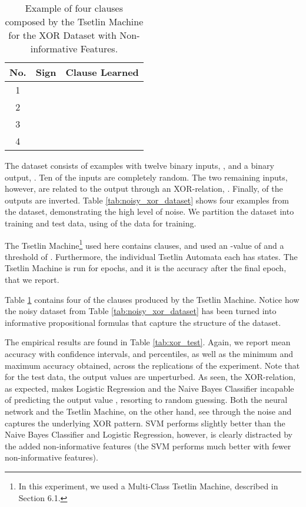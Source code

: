 \documentclass[11pt,a4paper]{article}
\begin{document}
\begin{table}[!bh]
    \centering
    \begin{tabular}{c|c|c}
    {\bf No.}&{\bf Sign}&{\bf Clause Learned}\\
    \hline 
    \hline
    1&&\\
    2&&\\
    3&&\\
    4&&
    \end{tabular}
    \caption{Example of four clauses composed by the Tsetlin Machine for the XOR Dataset with Non-informative Features.}
    \label{tab:noisy_xor_dataset_clauses}
\end{table}

The dataset consists of  examples with twelve binary inputs, , and a binary output, . Ten of the inputs are completely random. The two remaining inputs, however, are related to the output  through an XOR-relation, . Finally,  of the outputs are inverted. Table \ref{tab:noisy_xor_dataset} shows four examples from the dataset, demonstrating the high level of noise. We partition the dataset into training and test data, using  of the data for training.

The Tsetlin Machine\footnote{In this experiment, we used a Multi-Class Tsetlin Machine, described in Section 6.1.} used here contains  clauses, and used an -value of  and a threshold  of . Furthermore, the individual Tsetlin Automata each has  states. The Tsetlin Machine is run for  epochs, and it is the accuracy after the final epoch, that we report.

Table \ref{tab:noisy_xor_dataset_clauses} contains four of the clauses produced by the Tsetlin Machine. Notice how the noisy dataset from Table \ref{tab:noisy_xor_dataset} has been turned into informative propositional formulas that capture the structure of the dataset.

The empirical results are found in Table \ref{tab:xor_test}. Again, we report mean accuracy with  confidence intervals,  and  percentiles, as well as the minimum and maximum accuracy obtained, across the  replications of the experiment. Note that for the test data, the output values are unperturbed. As seen, the XOR-relation, as expected, makes Logistic Regression and the Naive Bayes Classifier incapable of predicting the output value , resorting to random guessing. Both the neural network and the Tsetlin Machine, on the other hand, see through the noise and captures the underlying XOR pattern. SVM performs slightly better than the Naive Bayes Classifier and Logistic Regression, however, is clearly distracted by the added non-informative features (the SVM performs much better with fewer non-informative features).
\end{document}
